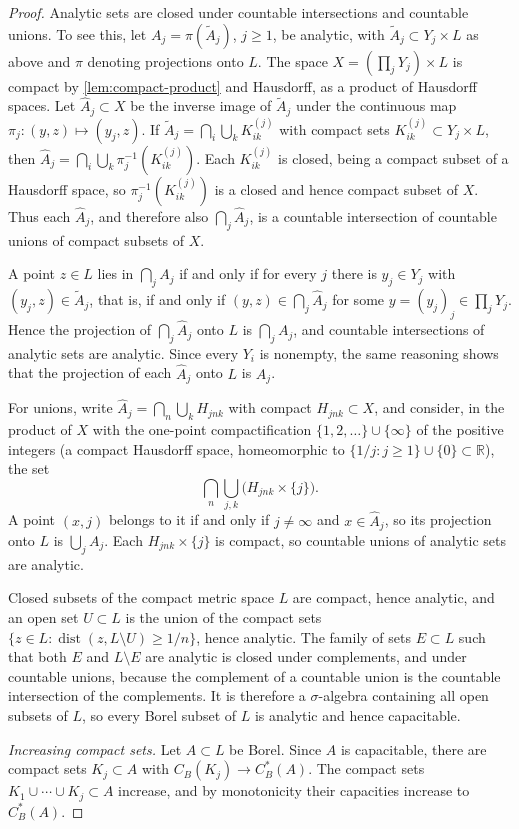 \begin{proof}
Analytic sets are closed under countable intersections and countable unions. To see this, let $A_j=\pi(\widetilde A_j)$, $j\geq1$, be analytic, with $\widetilde A_j\subset Y_j\times L$ as above and $\pi$ denoting projections onto $L$. The space $X=(\prod_jY_j)\times L$ is compact by \cref{lem:compact-product} and Hausdorff, as a product of Hausdorff spaces. Let $\widehat A_j\subset X$ be the inverse image of $\widetilde A_j$ under the continuous map $\pi_j\colon(y,z)\mapsto(y_j,z)$. If $\widetilde A_j=\bigcap_i\bigcup_kK^{(j)}_{ik}$ with compact sets $K^{(j)}_{ik}\subset Y_j\times L$, then $\widehat A_j=\bigcap_i\bigcup_k\pi_j^{-1}(K^{(j)}_{ik})$. Each $K^{(j)}_{ik}$ is closed, being a compact subset of a Hausdorff space, so $\pi_j^{-1}(K^{(j)}_{ik})$ is a closed and hence compact subset of $X$. Thus each $\widehat A_j$, and therefore also $\bigcap_j\widehat A_j$, is a countable intersection of countable unions of compact subsets of $X$.

A point $z\in L$ lies in $\bigcap_jA_j$ if and only if for every $j$ there is $y_j\in Y_j$ with $(y_j,z)\in\widetilde A_j$, that is, if and only if $(y,z)\in\bigcap_j\widehat A_j$ for some $y=(y_j)_j\in\prod_jY_j$. Hence the projection of $\bigcap_j\widehat A_j$ onto $L$ is $\bigcap_jA_j$, and countable intersections of analytic sets are analytic. Since every $Y_i$ is nonempty, the same reasoning shows that the projection of each $\widehat A_j$ onto $L$ is $A_j$.

For unions, write $\widehat A_j=\bigcap_n\bigcup_kH_{jnk}$ with compact $H_{jnk}\subset X$, and consider, in the product of $X$ with the one-point compactification $\{1,2,\ldots\}\cup\{\infty\}$ of the positive integers (a compact Hausdorff space, homeomorphic to $\{1/j:j\geq1\}\cup\{0\}\subset\mathbb R$), the set
\[
 \bigcap_n\bigcup_{j,k}\bigl(H_{jnk}\times\{j\}\bigr).
\]
A point $(x,j)$ belongs to it if and only if $j\neq\infty$ and $x\in\widehat A_j$, so its projection onto $L$ is $\bigcup_jA_j$. Each $H_{jnk}\times\{j\}$ is compact, so countable unions of analytic sets are analytic.

Closed subsets of the compact metric space $L$ are compact, hence analytic, and an open set $U\subset L$ is the union of the compact sets $\{z\in L:\operatorname{dist}(z,L\setminus U)\geq1/n\}$, hence analytic. The family of sets $E\subset L$ such that both $E$ and $L\setminus E$ are analytic is closed under complements, and under countable unions, because the complement of a countable union is the countable intersection of the complements. It is therefore a $\sigma$-algebra containing all open subsets of $L$, so every Borel subset of $L$ is analytic and hence capacitable.

\emph{Increasing compact sets.} Let $A\subset L$ be Borel. Since $A$ is capacitable, there are compact sets $K_j\subset A$ with $C_B(K_j)\to C_B^*(A)$. The compact sets $K_1\cup\cdots\cup K_j\subset A$ increase, and by monotonicity their capacities increase to $C_B^*(A)$.
\end{proof}

